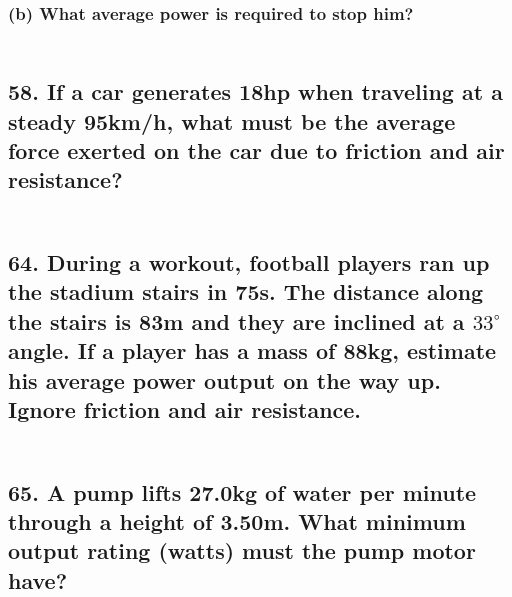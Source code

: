\documentclass[12pt,a4paper,english]{article}
\newcommand{\degree}[1]{${#1}^\circ$}
\begin{document}
\begin{flushleft}
  \subsubsection{(b) What average power is required to stop him?}
  \begin{align*}
  \end{align*}
  \subsection{58. If a car generates 18hp when traveling at a steady 95km/h, what must be the average force exerted on the car due to friction and air resistance?}
  \begin{align*}
  \end{align*}
  \subsection{64. During a workout, football players ran up the stadium stairs in 75s. The distance along the stairs is 83m and they are inclined at a \degree{33} angle. If a player has a mass of 88kg, estimate his average power output on the way up. Ignore friction and air resistance.}
  \begin{align*}
  \end{align*}
  \subsection{65. A pump lifts 27.0kg of water per minute through a height of 3.50m. What minimum output rating (watts) must the pump motor have?}
  \begin{align*}
  \end{align*}
\end{flushleft}
\end{document}
